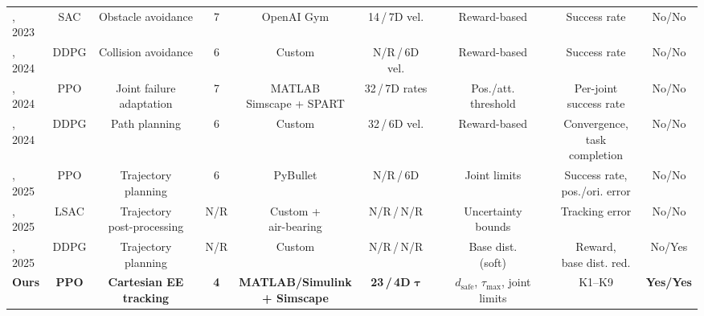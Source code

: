 \documentclass{ieeeaccess}
\providecommand{\DIFaddendFL}{} %
\DeclareRobustCommand{\DIFaddendFL}{\DIFOaddendFL \let\includegraphics\DIFOincludegraphics} %
\begin{document}
\begin{table}[!t]
\begin{tabular}{lcccccccc}
		\midrule
		\cite{huang2023obstacle}, 2023 & SAC & Obstacle avoidance & 7 & OpenAI Gym & 14\,/\,7D vel. & Reward-based & Success rate & No/No \\
		\cite{al2024reinforcement}, 2024 & DDPG & Collision avoidance & 6 & Custom & N/R\,/\,6D vel. & Reward-based & Success rate & No/No \\
		\cite{d2024failure}, 2024 & PPO & \makecell{Joint failure\\adaptation} & 7 & \makecell{MATLAB\\Simscape + SPART} & 32\,/\,7D rates & \makecell{Pos./att.\\threshold} & \makecell{Per-joint\\success rate} & No/No \\
		\cite{al2024path}, 2024 & DDPG & Path planning & 6 & Custom & 32\,/\,6D vel. & Reward-based & \makecell{Convergence,\\task completion} & No/No \\
		\cite{hu2025deep}, 2025 & PPO & Trajectory planning & 6 & PyBullet & N/R\,/\,6D & Joint limits & \makecell{Success rate,\\pos./ori. error} & No/No \\
		\cite{zhang2025learning}, 2025 & LSAC & \makecell{Trajectory\\post-processing} & N/R & \makecell{Custom +\\air-bearing} & N/R\,/\,N/R & \makecell{Uncertainty\\bounds} & Tracking error & No/No \\
		\cite{wei2025trajectory}, 2025 & DDPG & Trajectory planning & N/R & Custom & N/R\,/\,N/R & \makecell{Base dist.\\(soft)} & \makecell{Reward,\\base dist. red.} & No/Yes \\
		\midrule
		\textbf{Ours} & \textbf{PPO} & \makecell{\textbf{Cartesian EE}\\\textbf{tracking}} & \textbf{4} & \makecell{\textbf{MATLAB/Simulink}\\\textbf{+ Simscape}} & \textbf{23\,/\,4D} $\boldsymbol{\tau}$ & \makecell{$d_\text{safe}$, $\tau_\text{max}$,\\joint limits} & K1--K9 & \textbf{Yes/Yes} \\
		\bottomrule
	\end{tabular}
\DIFaddendFL \end{table}
\end{document}
